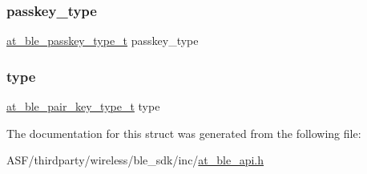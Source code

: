 \subsubsection{\texorpdfstring{passkey\_type}{passkey\_type}}
{\footnotesize\ttfamily \mbox{\hyperlink{at__ble__api_8h_ac6a17bd067ca4c0bccbf4c87b164cc19}{at\+\_\+ble\+\_\+passkey\+\_\+type\+\_\+t}} passkey\+\_\+type}

\mbox{\label{structat__ble__pair__key__request__t_ab3310bbf145c6be79b5d1cc2fe6dae76}} 
\subsubsection{\texorpdfstring{type}{type}}
{\footnotesize\ttfamily \mbox{\hyperlink{at__ble__api_8h_a6b252fad20280faa8087d1a8776c09a0}{at\+\_\+ble\+\_\+pair\+\_\+key\+\_\+type\+\_\+t}} type}



The documentation for this struct was generated from the following file\+:\begin{DoxyCompactItemize}
\item 
A\+S\+F/thirdparty/wireless/ble\+\_\+sdk/inc/\mbox{\hyperlink{at__ble__api_8h}{at\+\_\+ble\+\_\+api.\+h}}\end{DoxyCompactItemize}
